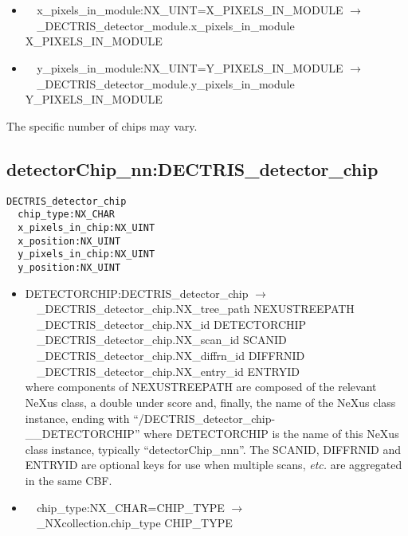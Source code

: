 \documentclass[11pt]{article}
\begin{document}
{{\begin{itemize}
\item{\verb|  |x\_pixels\_in\_module:NX\_UINT=X\_PIXELS\_IN\_MODULE $\rightarrow$\\
\verb|  |\_DECTRIS\_detector\_module.x\_pixels\_in\_module X\_PIXELS\_IN\_MODULE}

\item{\verb|  |y\_pixels\_in\_module:NX\_UINT=Y\_PIXELS\_IN\_MODULE $\rightarrow$\\
\verb|  |\_DECTRIS\_detector\_module.y\_pixels\_in\_module Y\_PIXELS\_IN\_MODULE}
\end{itemize}

The specific number of chips may vary.

\subsection{detectorChip\_nn:DECTRIS\_detector\_chip}

\begin{verbatim}
DECTRIS_detector_chip
  chip_type:NX_CHAR
  x_pixels_in_chip:NX_UINT
  x_position:NX_UINT
  y_pixels_in_chip:NX_UINT
  y_position:NX_UINT
\end{verbatim}

\begin{itemize}

\item{DETECTORCHIP:DECTRIS\_detector\_chip $\rightarrow$\\
\verb|  |\_DECTRIS\_detector\_chip.NX\_tree\_path    NEXUSTREEPATH \\
\verb|  |\_DECTRIS\_detector\_chip.NX\_id            DETECTORCHIP\\
\verb|  |\_DECTRIS\_detector\_chip.NX\_scan\_id      SCANID \\
\verb|  |\_DECTRIS\_detector\_chip.NX\_diffrn\_id    DIFFRNID \\
\verb|  |\_DECTRIS\_detector\_chip.NX\_entry\_id     ENTRYID \\
where components of NEXUSTREEPATH are composed of the
relevant NeXus class, a double under score and, finally, the
name of the NeXus class instance, ending with ``/DECTRIS\_detector\_chip- \\
\_\_DETECTORCHIP''
where DETECTORCHIP is the name of this NeXus class instance, typically ``detectorChip\_nnn''.
The SCANID, DIFFRNID and ENTRYID are optional keys for use
when multiple scans, {\it etc.} are aggregated in the same CBF.}

\item{\verb|  |chip\_type:NX\_CHAR=CHIP\_TYPE $\rightarrow$\\
\verb|  |\_NXcollection.chip\_type CHIP\_TYPE}


\end{itemize}}}
\end{document}
